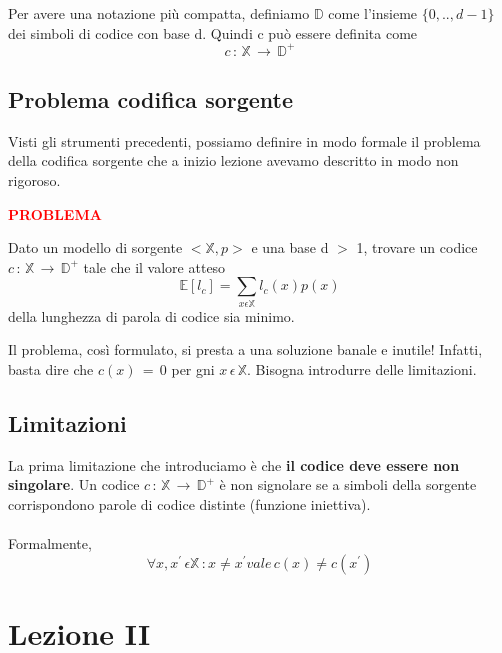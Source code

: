 \documentclass[12pt]{report}
\begin{document}
    \noindent Per avere una notazione più compatta, definiamo $\mathbb{D}$ come l'insieme $\{0,..,d-1\}$ dei simboli di codice con base d. Quindi c può essere definita come  $$c\,:\, \mathbb{X} \, \rightarrow \, \mathbb{D}^+$$

    \section{Problema codifica sorgente}

    Visti gli strumenti precedenti, possiamo definire in modo formale il problema della codifica sorgente che a inizio lezione avevamo descritto in modo non rigoroso.

    \vspace{5px}
    \begin{tcolorbox}
        \textbf{\textcolor{red}{PROBLEMA}}
        \vspace{5px}
        \begin{center}
            Dato un modello di sorgente $<\mathbb{X},p>$ e una base d $>$ 1, trovare un codice $c\,:\,\mathbb{X} \, \rightarrow \, \mathbb{D}^+$ tale che il valore atteso $$\mathbb{E}[l_c] = \sum_{x\epsilon\mathbb{X}} l_c(x) p(x)$$ della lunghezza di parola di codice sia minimo.
        \end{center}
    \end{tcolorbox}
    \vspace{5px}

    \noindent Il problema, così formulato, si presta a una soluzione banale e inutile! Infatti, basta dire che $c(x)\,=\,0$ per gni $x\,\epsilon\,\mathbb{X}$. Bisogna introdurre delle limitazioni.

    \section{Limitazioni}

    La prima limitazione che introduciamo è che \textbf{il codice deve essere non singolare}. Un codice $c\,:\,\mathbb{X}\,\rightarrow \, \mathbb{D}^+$ è non signolare se a simboli della sorgente corrispondono parole di codice distinte (funzione iniettiva).  \\
    \\
    Formalmente, $$\forall x,x^{'} \, \epsilon \mathbb{X}\,: x\neq x^{'} vale \, c(x) \neq c(x^{'})$$

    \chapter{Lezione II}
    \label{cap:Lezione II}
\end{document}
